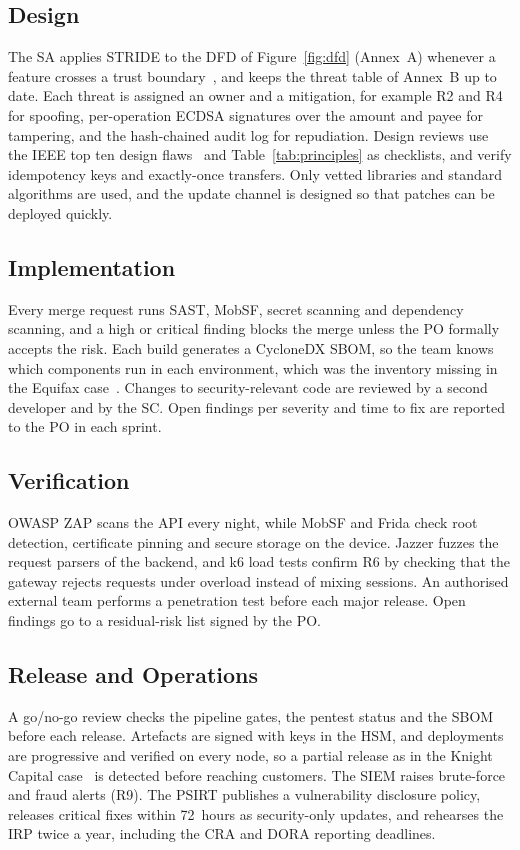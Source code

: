 \subsection{Design}
The SA applies \ac{STRIDE} to the \ac{DFD} of Figure~\ref{fig:dfd}
(Annex~A) whenever a feature crosses a trust boundary~\cite{shostack2014},
and keeps the threat table of Annex~B up to date. Each
threat is assigned an owner and a mitigation, for example R2 and R4 for
spoofing, per-operation ECDSA signatures over the amount and payee for
tampering, and the hash-chained audit log for repudiation. Design reviews use the
IEEE top ten design flaws~\cite{ieeecsd2014} and Table~\ref{tab:principles}
as checklists, and verify idempotency keys and exactly-once transfers. Only
vetted libraries and standard algorithms are used, and the update channel
is designed so that patches can be deployed quickly.

\subsection{Implementation}
Every merge request runs \ac{SAST}, MobSF, secret scanning and dependency
scanning, and a high or critical finding blocks the merge unless the PO
formally accepts the risk. Each build generates a CycloneDX \ac{SBOM}, so
the team knows which components run in each environment, which was the
inventory missing in the Equifax case~\cite{equifax2018}. Changes to
security-relevant code are reviewed by a second developer and by the SC.
Open findings per severity and time to fix are reported to the PO in each
sprint.

\subsection{Verification}
OWASP ZAP scans the \ac{API} every night, while MobSF and Frida check root
detection, certificate pinning and secure storage on the device. Jazzer
fuzzes the request parsers of the backend, and k6 load tests confirm R6 by
checking that the gateway rejects requests under overload instead of mixing
sessions. An authorised external team performs a penetration test before
each major release. Open findings go to a residual-risk list signed by
the PO.

\subsection{Release and Operations}
A go/no-go review checks the pipeline gates, the pentest status and the
\ac{SBOM} before each release. Artefacts are signed with keys in the
\ac{HSM}, and deployments are progressive and verified on every node, so a
partial release as in the Knight Capital case~\cite{knight2013} is
detected before reaching customers. The \ac{SIEM}
raises brute-force and fraud alerts (R9). The
\ac{PSIRT} publishes a vulnerability disclosure policy, releases critical
fixes within 72~hours as security-only updates, and rehearses the \ac{IRP}
twice a year, including the \ac{CRA} and \ac{DORA} reporting deadlines.

